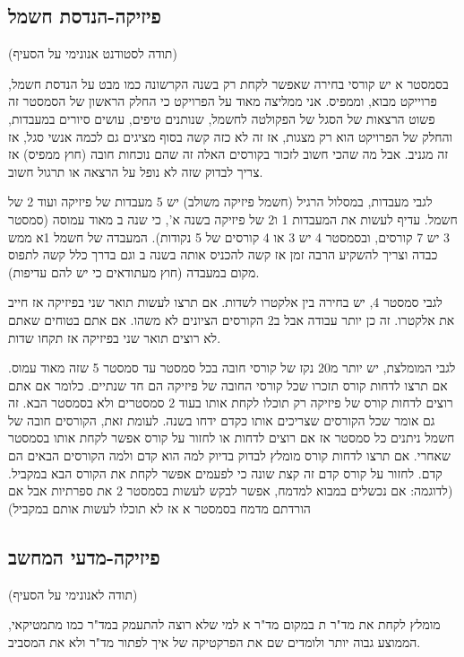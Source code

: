 \documentclass[a4paper,12pt]{article}
\begin{document}
\subsection{פיזיקה-הנדסת חשמל}

(תודה לסטודנט אנונימי על הסעיף)

בסמסטר א יש קורסי בחירה שאפשר לקחת רק בשנה הקרשונה כמו מבט על הנדסת חשמל, פרוייקט מבוא, וממפיס. אני ממליצה מאוד על הפרויקט כי החלק הראשון של הסמסטר זה פשוט הרצאות של הסגל של הפקולטה לחשמל, שנותנים טיפים, עושים סיורים במעבדות, והחלק של הפרויקט הוא רק מצגות, אז זה לא כזה קשה בסוף מציגים גם לכמה אנשי סגל, אז זה מגניב. אבל מה שהכי חשוב לזכור בקורסים האלה זה שהם נוכחות חובה (חוץ ממפיס) אז צריך לבדוק שזה לא נופל על הרצאה או תרגול חשוב.

לגבי מעבדות, במסלול הרגיל (חשמל פיזיקה משולב) יש 5 מעבדות של פיזיקה ועוד 2 של חשמל. עדיף לעשות את המעבדות 1 ו2 של פיזיקה בשנה א', כי שנה ב מאוד עמוסה (סמסטר 3 יש 7 קורסים, ובסמסטר 4 יש 3 או 4 קורסים של 5 נקודות). המעבדה של חשמל 1א ממש כבדה וצריך להשקיע הרבה זמן אז קשה להכניס אותה בשנה ב וגם בדרך כלל קשה לתפוס מקום במעבדה (חוץ מעתודאים כי יש להם עדיפות).

לגבי סמסטר 4, יש בחירה בין אלקטרו לשדות. אם תרצו לעשות תואר שני בפיזיקה אז חייב את אלקטרו. זה כן יותר עבודה אבל ב2 הקורסים הציונים לא משהו. אם אתם בטוחים שאתם לא רוצים תואר שני בפיזיקה אז תקחו שדות.

לגבי המומלצת, יש יותר מ20 נקז של קורסי חובה בכל סמסטר עד סמסטר 5 שזה מאוד עמוס. אם תרצו לדחות קורס תזכרו שכל קורסי החובה של פיזיקה הם חד שנתיים. כלומר אם אתם רוצים לדחות קורס של פיזיקה רק תוכלו לקחת אותו בעוד 2 סמסטרים ולא בסמסטר הבא. זה גם אומר שכל הקורסים שצריכים אותו כקדם ידחו בשנה. לעומת זאת, הקורסים חובה של חשמל ניתנים כל סמסטר אז אם רוצים לדחות או לחזור על קורס אפשר לקחת אותו בסמסטר שאחרי. אם תרצו לדחות קורס מומלץ לבדוק בדיוק למה הוא קדם ולמה הקורסים הבאים הם קדם. לחזור על קורס קדם זה קצת שונה כי לפעמים אפשר לקחת את הקורס הבא במקביל. (לדוגמה: אם נכשלים במבוא למדמח, אפשר לבקש לעשות בסמסטר 2 את ספרתיות אבל אם הורדתם מדמח בסמסטר א אז לא תוכלו לעשות אותם במקביל)

\subsection{פיזיקה-מדעי המחשב}

(תודה לאנונימי על הסעיף)

מומלץ לקחת את מד"ר ת במקום מד"ר א למי שלא רוצה להתעמק במד"ר כמו מתמטיקאי, הממוצע גבוה יותר ולומדים שם את הפרקטיקה של איך לפתור מד"ר ולא את המסביב.
\end{document}
